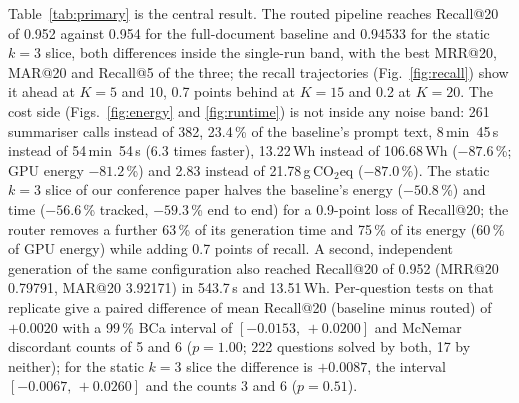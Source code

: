 \documentclass[pdflatex,sn-mathphys-num]{sn-jnl}
\makeatletter
\newif\ifprovenance
\newcommand{\verify}[1]{\ifprovenance\textcolor{red}{{\footnotesize [VERIFY: #1]}}\fi}
\newcommand{\gco}{g\,CO$_2$eq}
\newcommand{\Rec}[1]{Recall@#1}
\newcommand{\MRR}[1]{MRR@#1}
\newcommand{\MAR}[1]{MAR@#1}
\theoremstyle{thmstyleone}%
\theoremstyle{thmstylethree}%
\makeatother
\begin{document}
Table~\ref{tab:primary} is the central result. The routed pipeline reaches \Rec{20} of 0.952 against 0.954 for the full-document baseline and 0.94533 for the static $k=3$ slice, both differences inside the single-run band, with the best \MRR{20}, \MAR{20} and \Rec{5} of the three; the recall trajectories (Fig.~\ref{fig:recall}) show it ahead at $K=5$ and $10$, 0.7 points behind at $K=15$ and 0.2 at $K=20$.\verify{routed and baseline values: the four ``METRICS AT N='' blocks of \texttt{RnD/benchmarking\_retrievals.ipynb} (OWN = \texttt{ablation\_doc\_slice\_radius\_dynamic}, BASELINE = \texttt{anthropic\_control\_table}); static $k=3$: the \texttt{ablation\_doc\_slice\_radius\_3} blocks of \texttt{RnD/ablation\_doc\_slice\_retrieval.ipynb}} The cost side (Figs.~\ref{fig:energy} and \ref{fig:runtime}) is not inside any noise band: 261 summariser calls instead of 382, 23.4\,\% of the baseline's prompt text, 8\,min~45\,s instead of 54\,min~54\,s (6.3 times faster), 13.22\,Wh instead of 106.68\,Wh ($-87.6$\,\%; GPU energy $-81.2$\,\%) and 2.83 instead of 21.78\,\gco{} ($-87.0$\,\%).\verify{\texttt{duration}, \texttt{energy\_consumed}, \texttt{gpu\_energy}, \texttt{emissions} of the rows timestamped 2026-09-25T20:06:47 and 2026-03-05T23:59:43 in \texttt{RnD/emissions\_data/emissions.csv}; percentages $=1-\text{routed}/\text{baseline}$; calls and prompt text from the routing of \texttt{RnD/preprocessed\_chunks/ablation\_doc\_slice\_radius\_dynamic.json} (261 records with non-empty \texttt{context}) and the \texttt{cost.py} re-implementation} The static $k=3$ slice of our conference paper halves the baseline's energy ($-50.8$\,\%) and time ($-56.6$\,\% tracked, $-59.3$\,\% end to end) for a 0.9-point loss of \Rec{20}; the router removes a further 63\,\% of its generation time and 75\,\% of its energy (60\,\% of GPU energy) while adding 0.7 points of recall.\verify{$1-52.52/106.68=0.508$, $1-1428.2/3294.3=0.566$ from the rows timestamped 2026-03-05T22:53:27 and 2026-03-05T23:59:43; end-to-end $1-1749/4294=0.593$ from the notebook comments ``71m 34s'' (\texttt{RnD/anthropic\_traditional\_chunking.ipynb}) and ``29m 9s'' (\texttt{RnD/doc\_slice\_chunking.ipynb})} A second, independent generation of the same configuration also reached \Rec{20} of 0.952 (\MRR{20} 0.79791, \MAR{20} 3.92171) in 543.7\,s and 13.51\,Wh. Per-question tests on that replicate give a paired difference of mean \Rec{20} (baseline minus routed) of $+0.0020$ with a 99\,\% BCa interval of $[-0.0153,\,+0.0200]$ and McNemar discordant counts of 5 and 6 ($p=1.00$; 222 questions solved by both, 17 by neither); for the static $k=3$ slice the difference is $+0.0087$, the interval $[-0.0067,\,+0.0260]$ and the counts 3 and 6 ($p=0.51$).\verify{computed from \texttt{RnD/dynamic\_slice\_length/router\_experiments/results/res\_real\_binary\_t2\_heldout.json} and \texttt{res\_ablation\_doc\_slice\_radius\_3.json} against \texttt{res\_anthropic\_control\_table.json} with SciPy 1.17, 9\,999 resamples, seed 42; per question the routed pipeline is better on 6 and worse on 7}
\end{document}
